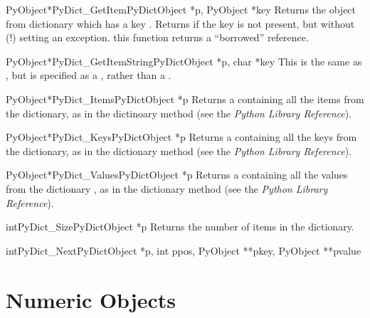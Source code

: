 \documentclass{manual}
\begin{document}
\begin{cfuncdesc}{PyObject*}{PyDict_GetItem}{PyDictObject *p, PyObject *key}
Returns the object from dictionary  which has a key
.  Returns \NULL{} if the key  is not present, but
without (!) setting an exception.    this function
returns a ``borrowed'' reference.
\end{cfuncdesc}

\begin{cfuncdesc}{PyObject*}{PyDict_GetItemString}{PyDictObject *p, char *key}
This is the same as , but  is
specified as a , rather than a .
\end{cfuncdesc}

\begin{cfuncdesc}{PyObject*}{PyDict_Items}{PyDictObject *p}
Returns a  containing all the items 
from the dictionary, as in the dictinoary method  (see
the \emph{Python Library Reference}).
\end{cfuncdesc}

\begin{cfuncdesc}{PyObject*}{PyDict_Keys}{PyDictObject *p}
Returns a  containing all the keys 
from the dictionary, as in the dictionary method  (see the
\emph{Python Library Reference}).
\end{cfuncdesc}

\begin{cfuncdesc}{PyObject*}{PyDict_Values}{PyDictObject *p}
Returns a  containing all the values 
from the dictionary , as in the dictionary method
 (see the \emph{Python Library Reference}).
\end{cfuncdesc}

\begin{cfuncdesc}{int}{PyDict_Size}{PyDictObject *p}
Returns the number of items in the dictionary.
\end{cfuncdesc}

\begin{cfuncdesc}{int}{PyDict_Next}{PyDictObject *p,
            int ppos,
            PyObject **pkey,
            PyObject **pvalue}

\end{cfuncdesc}


\section{Numeric Objects \label{numericObjects}}
\end{document}
